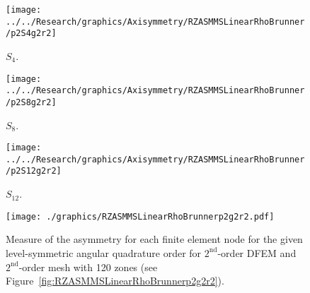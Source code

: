 \documentclass[12pt]{article}
\begin{document}
\begin{sidewaysfigure}[!htb]
\centering
\begin{subfigure}{0.33\textwidth}
\texttt{[image: ../../Research/graphics/Axisymmetry/RZASMMSLinearRhoBrunner/p2S4g2r2]}
\caption{$S_4$.}
\end{subfigure}%
\begin{subfigure}{0.33\textwidth}
\texttt{[image: ../../Research/graphics/Axisymmetry/RZASMMSLinearRhoBrunner/p2S8g2r2]}
\caption{$S_8$.}
\end{subfigure}%
\begin{subfigure}{0.33\textwidth}
\texttt{[image: ../../Research/graphics/Axisymmetry/RZASMMSLinearRhoBrunner/p2S12g2r2]}
\caption{$S_{12}$.}
\end{subfigure}
\caption{Relative asymmetry for $2^\text{nd}$-order finite elements on a $2^\text{nd}$-order mesh for given order of level-symmetric angular quadrature.}
\label{fig:RZASMMSLinearRhoBrunnerp2g2r2}
\end{sidewaysfigure}

\begin{figure}[!htb]
\centering
\texttt{[image: ./graphics/RZASMMSLinearRhoBrunnerp2g2r2.pdf]}
\caption{Measure of the asymmetry for each finite element node for the given level-symmetric angular quadrature order for $2^\text{nd}$-order DFEM and $2^\text{nd}$-order mesh with 120 zones (see Figure~\ref{fig:RZASMMSLinearRhoBrunnerp2g2r2}).}
\label{fig:RZASMMSLinearRhoBrunnerp2g2r2Nodes}
\end{figure}
\end{document}
